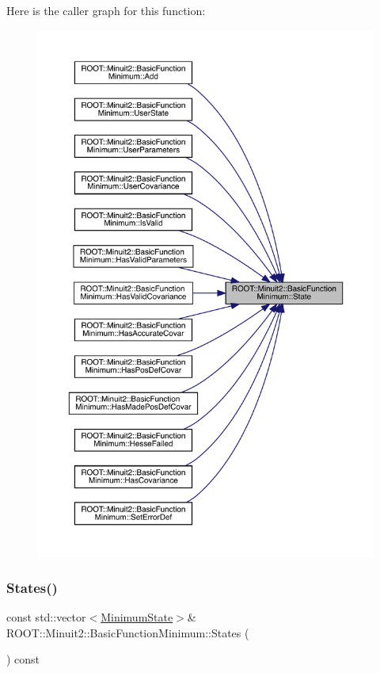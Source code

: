 Here is the caller graph for this function\+:
\nopagebreak
\begin{figure}[H]
\begin{center}
\leavevmode
\includegraphics[width=350pt]{de/d25/classROOT_1_1Minuit2_1_1BasicFunctionMinimum_a57c7f1a6d3551fd329698e0fc9424fec_icgraph}
\end{center}
\end{figure}
\mbox{\label{classROOT_1_1Minuit2_1_1BasicFunctionMinimum_a89080776340dc1cad0d73357a6c4b401}} 
\subsubsection{\texorpdfstring{States()}{States()}\hspace{0.1cm}{\footnotesize\ttfamily [1/3]}}
{\footnotesize\ttfamily const std\+::vector$<$\mbox{\hyperlink{classROOT_1_1Minuit2_1_1MinimumState}{Minimum\+State}}$>$\& R\+O\+O\+T\+::\+Minuit2\+::\+Basic\+Function\+Minimum\+::\+States (\begin{DoxyParamCaption}{ }\end{DoxyParamCaption}) const\hspace{0.3cm}{\ttfamily [inline]}}


